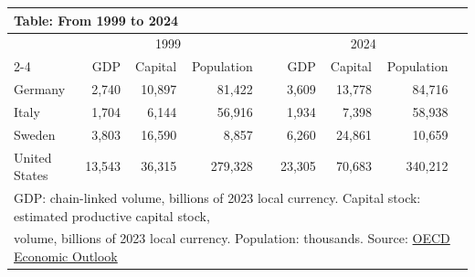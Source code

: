 \documentclass[12pt,a4paper]{article}
\begin{document}
\begin{table}[h]
    \centering
    \begin{tabular}{lrrrcrrrr}
        \multicolumn{9}{l}{\textbf{Table: From 1999 to 2024}} \\
        \hline
         & \multicolumn{3}{c}{1999} & & \multicolumn{3}{c}{2024} \\
         \cline{2-4} \cline{6-8} 
         & GDP & Capital & Population & & GDP & Capital & Population \\
        \hline
        Germany & 2,740 & 10,897 & 81,422 & & 3,609 & 13,778 & 84,716 \\
        Italy & 1,704 & 6,144 & 56,916 & & 1,934 & 7,398 & 58,938 \\
        Sweden & 3,803 & 16,590 & 8,857 & & 6,260 & 24,861 & 10,659 \\
        United States & 13,543 & 36,315 & 279,328 & & 23,305 & 70,683 & 340,212 \\
        \hline
        \multicolumn{9}{l}{
             \footnotesize{GDP: chain-linked volume, billions of 2023 local currency. Capital stock: estimated productive capital stock,}
        } \\
        \multicolumn{9}{l}{
            \footnotesize{volume, billions of 2023 local currency. Population: thousands. Source: \href{https://www.oecd.org/en/topics/economic-outlook.html}{OECD Economic Outlook}}
        } \\
    \end{tabular}
\end{table}
\end{document}
